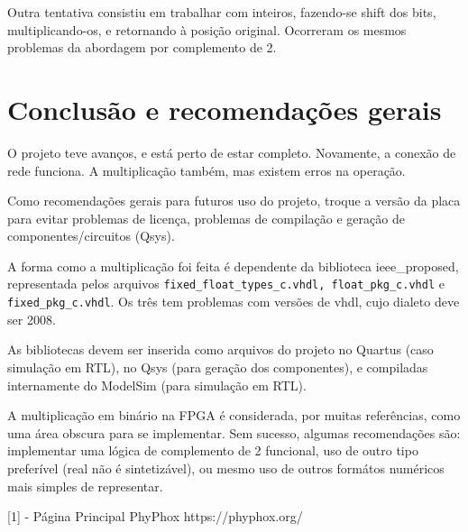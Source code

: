 \documentclass [12pt,oneside] {article}
\begin{document}
	Outra tentativa consistiu em trabalhar com inteiros,
fazendo-se shift dos bits, multiplicando-os, e retornando à posição
original. Ocorreram os mesmos problemas da abordagem por complemento
de 2.


\section{Conclusão e recomendações gerais}

	O projeto teve avanços, e está perto de estar completo.
Novamente, a conexão de rede funciona. A multiplicação também, mas existem erros na
operação.

	Como recomendações gerais para futuros uso do projeto, troque
a versão da placa para evitar problemas de licença, problemas de
compilação e geração de componentes/circuitos (Qsys).

	A forma como a multiplicação foi feita é dependente da
biblioteca ieee\_proposed, representada pelos arquivos
\texttt{fixed\_float\_types\_c.vhdl, float\_pkg\_c.vhdl} e
\texttt{fixed\_pkg\_c.vhdl}. Os três tem problemas com versões de
vhdl, cujo dialeto deve ser 2008.

	As bibliotecas devem ser inserida como arquivos do projeto no
Quartus (caso simulação em RTL), no Qsys (para geração dos
componentes), e compiladas internamente do ModelSim (para simulação em
RTL).

	A multiplicação em binário na FPGA é considerada, por muitas
referências, como uma área obscura para se implementar. Sem sucesso,
algumas recomendações são: implementar uma lógica de complemento de 2
funcional, uso de outro tipo preferível (real não é sintetizável), ou
mesmo uso de outros formátos numéricos mais simples de representar.


[1] - Página Principal PhyPhox https://phyphox.org/
\end{document}
